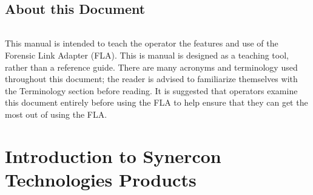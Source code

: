 \documentclass[11pt, oneside]{book}
\begin{document}
\chapter*{About this Document}
\paragraph{  }
This manual is intended to teach the operator the features and use
of the Forensic Link Adapter (FLA). This is manual is designed as
a teaching tool, rather than a reference guide. There are many acronyms
and terminology used throughout this document; the reader is advised
to familiarize themselves with the Terminology section before reading.
It is suggested that operators examine this document entirely before using
the FLA to help ensure that they can get the most out of using the FLA.


\part{Introduction to Synercon Technologies Products}
\end{document}
